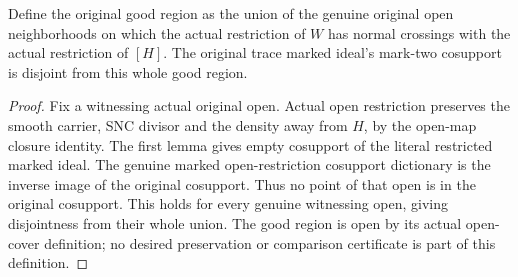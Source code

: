 \begin{theorem}
\label{hir:sharp-single-boundary-trace-avoids-good-nc-region}
\leanok
Define the original good region as the union of the genuine original open
neighborhoods on which the actual restriction of $W$ has normal crossings
with the actual restriction of $[H]$. The original trace marked ideal's
mark-two cosupport is disjoint from this whole good region.
\end{theorem}
\begin{proof}
Fix a witnessing actual original open. Actual open restriction preserves
the smooth carrier, SNC divisor and the density away from $H$, by the
open-map closure identity. The first lemma gives empty cosupport of the
literal restricted marked ideal. The genuine marked open-restriction
cosupport dictionary is the inverse image of the original cosupport.
Thus no point of that open is in the original cosupport. This holds for
every genuine witnessing open, giving disjointness from their whole union.
The good region is open by its actual open-cover definition; no desired
preservation or comparison certificate is part of this definition.
\end{proof}

